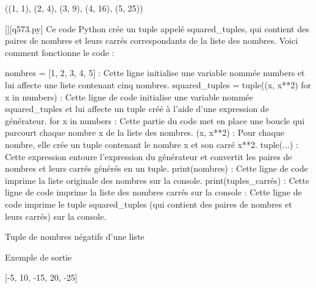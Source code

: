 ((1, 1), (2, 4), (3, 9), (4, 16), (5, 25))
        \par
        \begin{solution}
            \renewcommand{\nomfichier}{q573.py}
            \pythonfile{\chemincode \nomfichier}[][\nomfichier]
            Ce code Python crée un tuple appelé squared_tuples, qui contient des paires de nombres et leurs carrés correspondants de la liste des nombres. Voici comment fonctionne le code :

    nombres = [1, 2, 3, 4, 5] : Cette ligne initialise une variable nommée numbers et lui affecte une liste contenant cinq nombres.
    squared_tuples = tuple((x, x**2) for x in numbers) : Cette ligne de code initialise une variable nommée squared_tuples et lui affecte un tuple créé à l'aide d'une expression de générateur.
        for x in numbers : Cette partie du code met en place une boucle qui parcourt chaque nombre x de la liste des nombres.
        (x, x**2) : Pour chaque nombre, elle crée un tuple contenant le nombre x et son carré x**2.
        tuple(...) : Cette expression entoure l'expression du générateur et convertit les paires de nombres et leurs carrés générés en un tuple.
    print(nombres) : Cette ligne de code imprime la liste originale des nombres sur la console.
    print(tuples_carrés) : Cette ligne de code imprime la liste des nombres carrés sur la console : Cette ligne de code imprime le tuple squared_tuples (qui contient des paires de nombres et leurs carrés) sur la console.
        \end{solution}
        

        \question
        Tuple de nombres négatifs d'une liste

Exemple de sortie

[-5, 10, -15, 20, -25]

